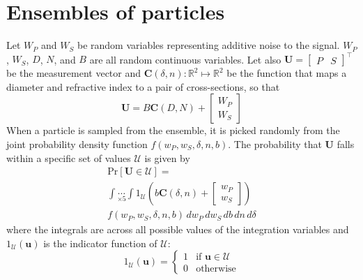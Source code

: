 \documentclass[journal]{IEEEtran}
\begin{document}
\section{Ensembles of particles}
\par Let $W_{\scriptscriptstyle{P}}$ and $W_{\scriptscriptstyle{S}}$ be random variables representing additive noise to the signal. $W_{\scriptscriptstyle{P}}$, $W_{\scriptscriptstyle{S}}$, $D$, $N$, and $B$ are all random continuous variables. Let also $\mathbf{U}=\begin{bmatrix}
    P & S
\end{bmatrix}^\intercal$ be the measurement vector and $\mathbf{C}(\delta, n): \mathbb{R}^2\mapsto \mathbb{R}^2$ be the function that maps a diameter and refractive index to a pair of cross-sections, so that
\begin{equation}
    \mathbf{U}=B\mathbf{C}(D, N)+\begin{bmatrix}W_{\scriptscriptstyle{P}}\\W_{\scriptscriptstyle{S}}\end{bmatrix}
\end{equation}
When a particle is sampled from the ensemble, it is picked randomly from the joint probability density function $f(w_{\scriptscriptstyle{P}}, w_{\scriptscriptstyle{S}},\delta, n, b)$. The probability that $\mathbf{U}$ falls within a specific set of values $\mathcal{U}$ is given by
\begin{multline}\label{eq:ubinprob}
    \mathrm{Pr}[\mathbf{U}\in \mathcal{U}]=\\
    \int\!\!\underset{\mathrm{\times5}}{\cdots}\!\!\int1_{\mathcal{U}}\left(b\mathbf{C}(\delta, n)+\begin{bmatrix}w_{\scriptscriptstyle{P}}\\w_{\scriptscriptstyle{S}}\end{bmatrix}\right)\\
    f(w_{\scriptscriptstyle{P}}, w_{\scriptscriptstyle{S}}, \delta, n, b)\,dw_{\scriptscriptstyle{P}}\,dw_{\scriptscriptstyle{S}}\,db\,dn\,d\delta
\end{multline}
where the integrals are across all possible values of the integration variables and $1_{\mathcal{U}}(\mathbf{u})$ is the indicator function of $\mathcal{U}$:
\begin{equation}
    1_{\mathcal{U}}(\mathbf{u})=\begin{cases}
        1 & \textrm{if } \mathbf{u} \in \mathcal{U}\\
        0 & \textrm{otherwise}
    \end{cases}
\end{equation} 
\end{document}
